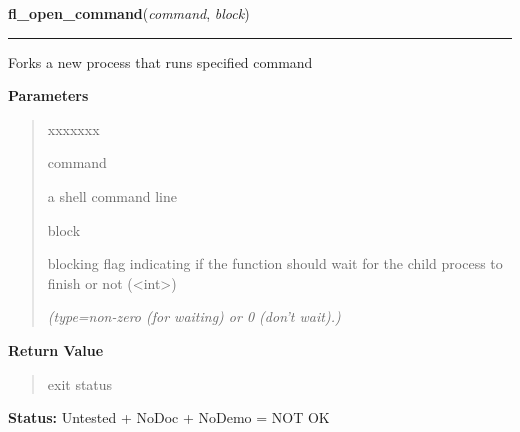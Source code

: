 \hspace{.8\funcindent}\begin{boxedminipage}{\funcwidth}

    \raggedright \textbf{fl\_open\_command}(\textit{command}, \textit{block})

    \vspace{-1.5ex}

    \rule{\textwidth}{0.5\fboxrule}
\setlength{\parskip}{2ex}
    Forks a new process that runs specified command

\setlength{\parskip}{1ex}
      \textbf{Parameters}
      \vspace{-1ex}

      \begin{quote}
        \begin{Ventry}{xxxxxxx}

          \item[command]

          a shell command line

          \item[block]

          blocking flag indicating if the function should wait for the 
          child process to finish or not ({\textless}int{\textgreater})

            {\it (type=non-zero (for waiting) or 0 (don't wait).)}

        \end{Ventry}

      \end{quote}

      \textbf{Return Value}
    \vspace{-1ex}

      \begin{quote}
      exit status

      \end{quote}

\textbf{Status:} Untested + NoDoc + NoDemo = NOT OK



    \end{boxedminipage}

    \label{xformslib:flgoodies:fl_end_command}

    \vspace{0.5ex}

